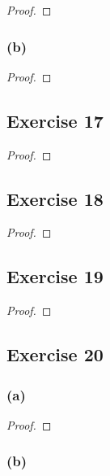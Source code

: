 \documentclass[14pt]{extarticle}
\begin{document}
\begin{proof}

\end{proof}

\subsubsection{(b)}

\begin{proof}

\end{proof}

\subsection{Exercise 17}

\begin{proof}

\end{proof}

\subsection{Exercise 18}

\begin{proof}

\end{proof}

\subsection{Exercise 19}

\begin{proof}

\end{proof}

\subsection{Exercise 20}

\subsubsection{(a)}

\begin{proof}

\end{proof}

\subsubsection{(b)}
\end{document}
